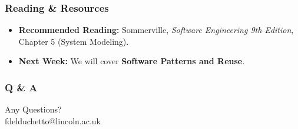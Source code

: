 \documentclass[xcolor=table]{beamer}
\begin{document}

\begin{frame}
    \frametitle{Reading \& Resources}
    \begin{itemize}
        \item \textbf{Recommended Reading:} 
        Sommerville, \textit{Software Engineering 9th Edition}, Chapter 5 (System Modeling).
        \item \textbf{Next Week:} We will cover \textbf{Software Patterns and Reuse}.
    \end{itemize}
\end{frame}

\begin{frame}
    \frametitle{Q \& A}
    \begin{center}
        \Huge Any Questions?\\\vspace{0.5cm} 
        \normalsize fdelduchetto@lincoln.ac.uk
    \end{center}
\end{frame}
\end{document}
